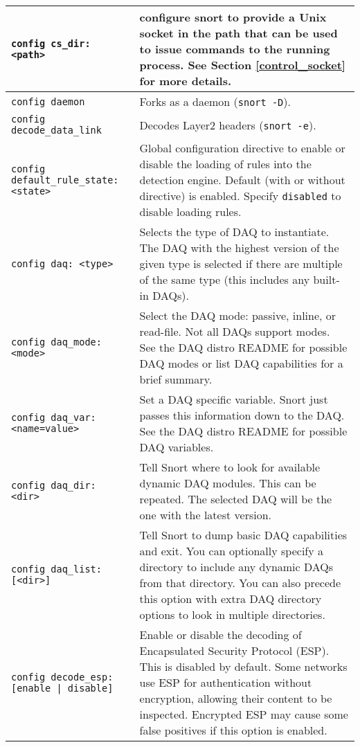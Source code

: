 \documentclass[english]{report}
\begin{document}
\begin{center}
\begin{longtable}[t]{| p{2.5in} | p{3.5in} |}
\hline
\texttt{config cs\_dir: <path>} & configure snort to provide a Unix socket in the path
that can be used to issue commands to the running process. See Section
\ref{control_socket} for more details.\\

\hline
\texttt{config daemon} & Forks as a daemon (\texttt{snort -D}). \\

\hline
\texttt{config decode\_data\_link} & Decodes Layer2 headers (\texttt{snort
-e}). \\

\hline
\texttt{config default\_rule\_state: <state>} & Global configuration directive
to enable or disable the loading of rules into the detection engine.  Default
(with or without directive) is enabled.  Specify \texttt{disabled} to disable
loading rules. \\

\hline
\texttt{config daq: <type>} & Selects the type of DAQ to instantiate.  The
DAQ with the highest version of the given type is selected if there are 
multiple of the same type (this includes any built-in DAQs).\\

\hline
\texttt{config daq\_mode: <mode>} & Select the DAQ mode: passive, inline, or
read-file.  Not all DAQs support modes.  See the DAQ distro README for
possible DAQ modes or list DAQ capabilities for a brief summary. \\

\hline
\texttt{config daq\_var: <name=value>} & Set a DAQ specific variable.  Snort
just passes this information down to the DAQ.  See the DAQ distro README for
possible DAQ variables. \\

\hline
\texttt{config daq\_dir: <dir>} & Tell Snort where to look for available
dynamic DAQ modules.  This can be repeated.  The selected DAQ will be the
one with the latest version. \\

\hline \texttt{config daq\_list: [<dir>]} & Tell Snort to dump basic DAQ
capabilities and exit.  You can optionally specify a directory to include any
dynamic DAQs from that directory.  You can also precede this option with extra
DAQ directory options to look in multiple directories. \\

\hline
\texttt{config decode\_esp: [enable | disable]} & Enable or disable the decoding of
Encapsulated Security Protocol (ESP). This is disabled by default.
Some networks use ESP for authentication without encryption, allowing their
content to be inspected. Encrypted ESP may cause some false positives if this
option is enabled.\\


\end{longtable}
\end{center}
\end{document}
